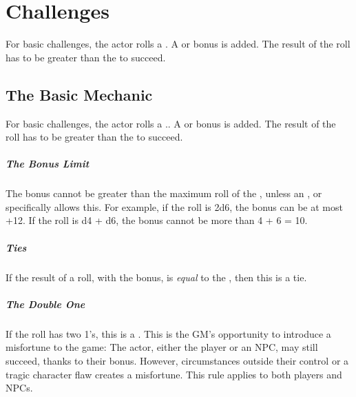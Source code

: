 \chapterspaceabove{6.75cm}
\chapterspacebelow{11.25cm}


\chapter{Challenges}

\begin{emphasisParagraph}
	For basic challenges, the actor rolls a .
	A  or  bonus is added.
	The result of the roll has to be greater than the  to succeed.
\end{emphasisParagraph}

\section{The Basic Mechanic}
For basic challenges, the actor rolls a ..
A  or  bonus is added.
The result of the roll has to be greater than the  to succeed.\\

\paragraph*{The Bonus Limit}
The bonus cannot be greater than the maximum roll of the ,
unless an ,  or  specifically allows this.
For example, if the roll is 2d6, the bonus can be at most +12. If the roll is d4 + d6,
the bonus cannot be more than 4 + 6 = 10.\\

\paragraph*{Ties}
If the result of a roll, with the bonus, is \emph{equal} to the \acronymDL,
then this is a tie.

\paragraph*{The Double One}

If the roll has two 1's, this is a .
This is the GM's opportunity to introduce a misfortune to the game:
The actor, either the player or an NPC, may still succeed, thanks to their bonus.
However, circumstances outside their control or a tragic character flaw creates a misfortune.
This rule applies to both players and NPCs. \\

